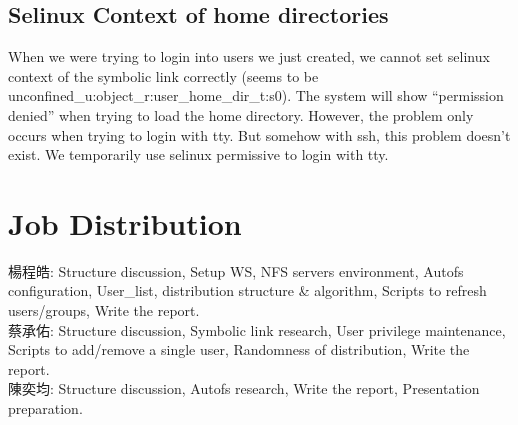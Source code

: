 \documentclass{article}
\begin{document}
\subsection{Selinux Context of home directories}
When we were trying to login into users we just created, we cannot set selinux context of the symbolic link correctly (seems to be unconfined\_u:object\_r:user\_home\_dir\_t:s0). The system will show ``permission denied'' when trying to load the home directory. However, the problem only occurs when trying to login with tty. But somehow  with ssh, this problem doesn't exist. We temporarily use selinux permissive to login with tty.

\section{Job Distribution}
\noindent
楊程皓: Structure discussion, Setup WS, NFS servers environment, Autofs configuration, User\_list, distribution structure \& algorithm, Scripts to refresh users/groups, Write the report. \\
\noindent
蔡承佑: Structure discussion, Symbolic link research, User privilege maintenance, Scripts to add/remove a single user, Randomness of distribution, Write the report. \\
\noindent
陳奕均: Structure discussion, Autofs research, Write the report, Presentation preparation. \\
\end{document}
